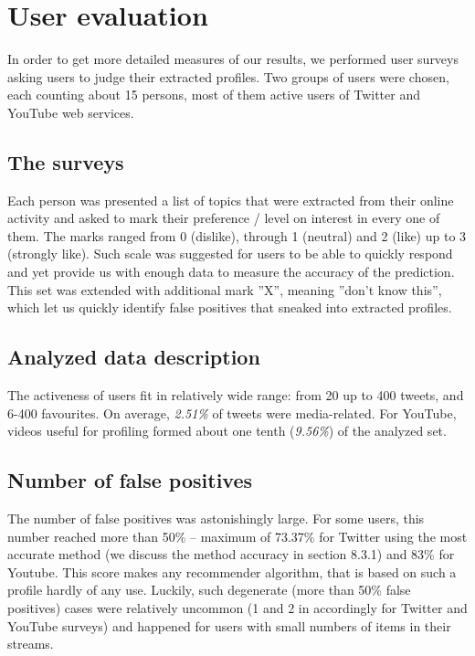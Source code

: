 \section{User evaluation}
In order to get more detailed measures of our results, we performed user surveys
asking users to judge their extracted profiles. Two groups of users were chosen,
each counting about 15 persons, most of them active users of Twitter and YouTube
web services.

\subsection{The surveys}

Each person was presented a list of topics that were extracted from their online
activity and asked to mark their preference / level on interest in every one of
them. The marks ranged from 0 (dislike), through 1 (neutral) and 2 (like) up to
3 (strongly like). Such scale was suggested for users to be able to quickly respond
and yet provide us with enough data to measure the accuracy of the prediction.
This set was extended with additional mark ''X'', meaning
''don't know this'', which let us quickly identify false positives that sneaked
into extracted profiles.

\subsection{Analyzed data description}
The activeness of users fit in relatively wide range: from 20 up to 400 tweets,
and 6-400 favourites. On average, \textit{2.51\%} of tweets were media-related.
For YouTube, videos useful for profiling formed about one tenth (\textit{9.56\%})
of the analyzed set.

\subsection{Number of false positives}
The number of false positives was astonishingly large. For some users, this
number reached more than 50\% -- maximum of 73.37\% for Twitter using the most accurate method (we discuss
the method accuracy in section 8.3.1) and 83\% for Youtube. This score makes any recommender
algorithm, that is based on such a profile hardly of any use. Luckily, such degenerate
(more than 50\% false positives) cases were relatively uncommon (1 and 2 in accordingly for
Twitter and YouTube surveys) and happened for users with small numbers of items in their streams.

